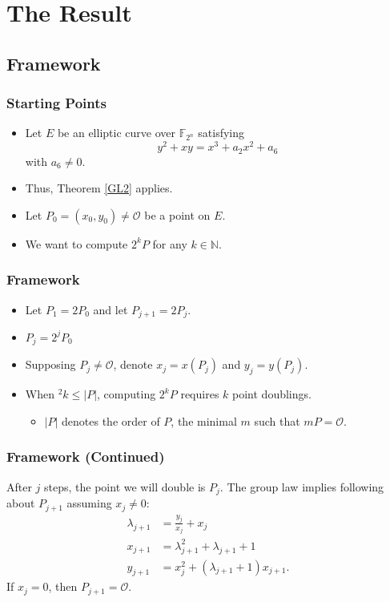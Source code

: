 \documentclass[xcolor=pdftex,dvipsnames,table]{beamer}
\theoremstyle{plain}
\theoremstyle{definition}
\def\NN{\mathbb{N}}
\def\FF{\mathbb{F}}
\begin{document}
\section[The Result]{The Result}

\subsection[Framework]{Framework}

\begin{frame}
	\frametitle{Starting Points}
	
	\begin{itemize}
		\item Let $E$ be an elliptic curve over $\FF_{2^n}$ satisfying 
		\[
		y^2+xy=x^3+a_2x^2+a_6
		\]
		with $a_6\neq 0$.
		
		\item Thus, Theorem \autoref{GL2} applies.
		
		\item Let $P_0=(x_0,y_0)\neq\mathcal{O}$ be a point on $E$.
		
		\item We want to compute $2^k P$ for any $k\in\NN$.
	\end{itemize}
\end{frame}

\begin{frame}
	\frametitle{Framework}
	
	\begin{itemize}
		\item Let $P_1 = 2P_0$ and let $P_{j+1}=2P_j$.
		\item $P_j=2^j P_0$
		\item Supposing $P_j\neq\mathcal{O}$, denote $x_j=x(P_j)$ and $y_j=y(P_j)$.
		\item When $^2k \leq|P|$, computing $2^kP$ requires $k$ point doublings.
		\begin{itemize}
			\item $|P|$ denotes the order of $P$, the minimal $m$ such that $mP=\mathcal{O}$.
		\end{itemize}
	\end{itemize}
	
\end{frame}

\begin{frame}
	\frametitle{Framework (Continued)}
	
	After $j$ steps, the point we will double is $P_j$.
	The group law implies following about $P_{j+1}$ assuming $x_j\neq 0$:
	\begin{align}
	\lambda_{j+1}&=\frac{y_j}{x_j}+x_j\label{eqnlmb}\\
	x_{j+1}&=\lambda_{j+1}^2+\lambda_{j+1}+1\label{eqnx}\\
	y_{j+1}&=x_j^2+(\lambda_{j+1}+1)x_{j+1}\label{eqny}.
	\end{align}
	If $x_j=0$, then $P_{j+1}=\mathcal{O}$.
\end{frame}
\end{document}
